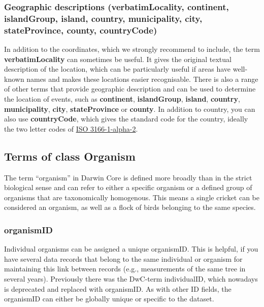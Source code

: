 \documentclass[
]{book}
\begin{document}
\hypertarget{geographic-descriptions-verbatimlocality-continent-islandgroup-island-country-municipality-city-stateprovince-county-countrycode}{%
\subsubsection{Geographic descriptions (verbatimLocality, continent, islandGroup, island, country, municipality, city, stateProvince, county, countryCode)}\label{geographic-descriptions-verbatimlocality-continent-islandgroup-island-country-municipality-city-stateprovince-county-countrycode}}

In addition to the coordinates, which we strongly recommend to include, the term \textbf{verbatimLocality} can sometimes be useful. It gives the original textual description of the location, which can be particularly useful if areas have well-known names and makes these locations easier recognisable. There is also a range of other terms that provide geographic description and can be used to determine the location of events, such as \textbf{continent}, \textbf{islandGroup}, \textbf{island}, \textbf{country}, \textbf{municipality}, \textbf{city}, \textbf{stateProvince} or \textbf{county}. In addition to country, you can also use \textbf{countryCode}, which gives the standard code for the country, ideally the two letter codes of \href{https://www.iban.com/country-codes}{ISO 3166-1-alpha-2}.

\hypertarget{terms-of-class-organism}{%
\subsection{Terms of class Organism}\label{terms-of-class-organism}}

The term ``organism'' in Darwin Core is defined more broadly than in the strict biological sense and can refer to either a specific organism or a defined group of organisms that are taxonomically homogenous. This means a single cricket can be considered an organism, as well as a flock of birds belonging to the same species.

\hypertarget{organismid}{%
\subsubsection{organismID}\label{organismid}}

Individual organisms can be assigned a unique organismID. This is helpful, if you have several data records that belong to the same individual or organism for maintaining this link between records (e.g., measurements of the same tree in several years). Previously there was the DwC-term individualID, which nowadays is deprecated and replaced with organismID. As with other ID fields, the organismID can either be globally unique or specific to the dataset.
\end{document}
